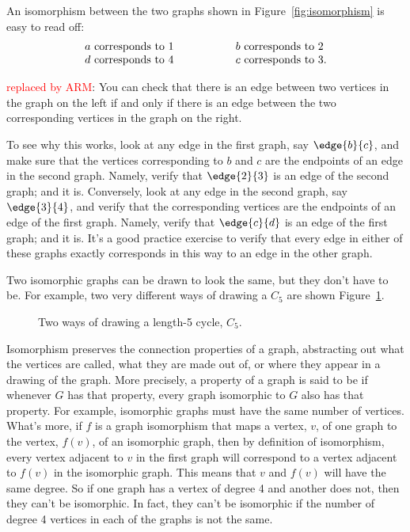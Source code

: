 An isomorphism between the two graphs shown in
Figure~\ref{fig:isomorphism} is easy to read off:
\[
\begin{array}{lll}
a \text{ corresponds to } 1 & \hspace{0.5in} & b \text{ corresponds to } 2 \\
d \text{ corresponds to } 4 & & c \text{ corresponds to } 3.
\end{array}
\]
\begin{editingnotes}
\textcolor{red}{replaced by ARM}: You can check that there is an edge between two
  vertices in the graph on the left if and only if there is an edge
  between the two corresponding vertices in the graph on the right.
\end{editingnotes}
To see why this works, look at any edge in the first graph, say
$\edge{b}{c}$, and make sure that the vertices corresponding to $b$ and
$c$ are the endpoints of an edge in the second graph.  Namely, verify that
$\edge{2}{3}$ is an edge of the second graph; and it is.  Conversely, look
at any edge in the second graph, say $\edge{3}{4}$, and verify that the
corresponding vertices are the endpoints of an edge of the first
graph. Namely, verify that $\edge{c}{d}$ is an edge of the first graph;
and it is.  It's a good practice exercise to verify that every edge in
either of these graphs exactly corresponds in this way to an edge in the
other graph.

 Two isomorphic graphs can be drawn to look the same, but
they don't have to be.  For example, two very different ways of drawing a
$C_5$ are shown Figure~\ref{fig:isomorphism-c5}.

\begin{figure}


\caption{Two ways of drawing a length-5 cycle, $C_5$.}
\label{fig:isomorphism-c5}
\end{figure}

Isomorphism preserves the connection properties of a graph,
abstracting out what the vertices are called, what they are made out
of, or where they appear in a drawing of the graph.  More precisely, a
property of a graph is said to be 
if whenever $G$ has that property, every graph isomorphic to $G$ also
has that property.  For example, isomorphic graphs must have the same
number of vertices.  What's more, if $f$ is a graph isomorphism that
maps a vertex, $v$, of one graph to the vertex, $f(v)$, of an
isomorphic graph, then by definition of isomorphism, every vertex
adjacent to $v$ in the first graph will correspond to a vertex
adjacent to $f(v)$ in the isomorphic graph.  This means that $v$ and
$f(v)$ will have the same degree.  So if one graph has a vertex of
degree 4 and another does not, then they can't be isomorphic.  In
fact, they can't be isomorphic if the number of degree 4 vertices in
each of the graphs is not the same.

